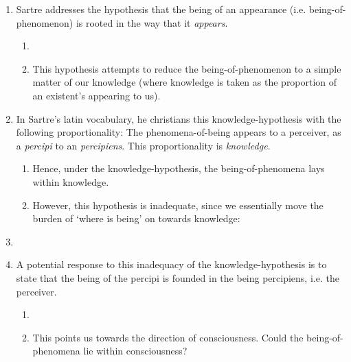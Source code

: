 \begin{enumerate}
  \item Sartre addresses the hypothesis that the being of an appearance (i.e. being-of-phenomenon) is rooted in the way that it \emph{appears}.
  \begin{enumerate}
    \item {}
    \item This hypothesis attempts to reduce the being-of-phenomenon to a simple matter of our knowledge (where knowledge is taken as the proportion of an existent's appearing to us).
  \end{enumerate}
  \item In Sartre's latin vocabulary, he christians this knowledge-hypothesis with the following proportionality: The phenomena-of-being appears to a perceiver, as a \emph{percipi} to an \emph{percipiens}. This proportionality is \emph{knowledge}.
  \begin{enumerate}
    \item Hence, under the knowledge-hypothesis, the being-of-phenomena lays within knowledge.
    \item However, this hypothesis is inadequate, since we essentially move the burden of \enquote*{where is being} on towards knowledge:
  \end{enumerate}
  \item {}
  \item A potential response to this inadequacy of the knowledge-hypothesis is to state that the being of the percipi is founded in the being percipiens, i.e. the perceiver.
  \begin{enumerate}
    \item {}
    \item This points us towards the direction of consciousness. Could the being-of-phenomena lie within consciousness?
  \end{enumerate}
\end{enumerate}

